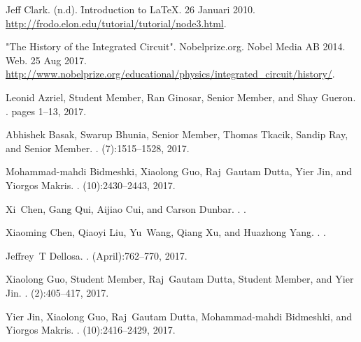 %

\begin{thebibliography}{10}

%

{Jeff Clark. (n.d). \f{Introduction to LaTeX}. 26 Januari 2010. \url{http://frodo.elon.edu/tutorial/tutorial/node3.html}.}

{"The History of the Integrated Circuit". Nobelprize.org. Nobel Media AB 2014. Web. 25 Aug 2017. \url{http://www.nobelprize.org/educational/physics/integrated_circuit/history/}.}

Leonid Azriel, Student Member, Ran Ginosar, Senior Member, and Shay Gueron.
.
\newblock pages 1--13, 2017.

Abhishek Basak, Swarup Bhunia, Senior Member, Thomas Tkacik, Sandip Ray, and
Senior Member.
.
(7):1515--1528, 2017.

Mohammad-mahdi Bidmeshki, Xiaolong Guo, Raj~Gautam Dutta, Yier Jin, and Yiorgos
Makris.
.
(10):2430--2443, 2017.

Xi~Chen, Gang Qui, Aijiao Cui, and Carson Dunbar.
.
.

Xiaoming Chen, Qiaoyi Liu, Yu~Wang, Qiang Xu, and Huazhong Yang.
.
.

Jeffrey~T Dellosa.
.
\newblock (April):762--770, 2017.

Xiaolong Guo, Student Member, Raj~Gautam Dutta, Student Member, and Yier Jin.
.
(2):405--417, 2017.

Yier Jin, Xiaolong Guo, Raj~Gautam Dutta, Mohammad-mahdi Bidmeshki, and Yiorgos
Makris.
.
(10):2416--2429, 2017.


\end{thebibliography}
